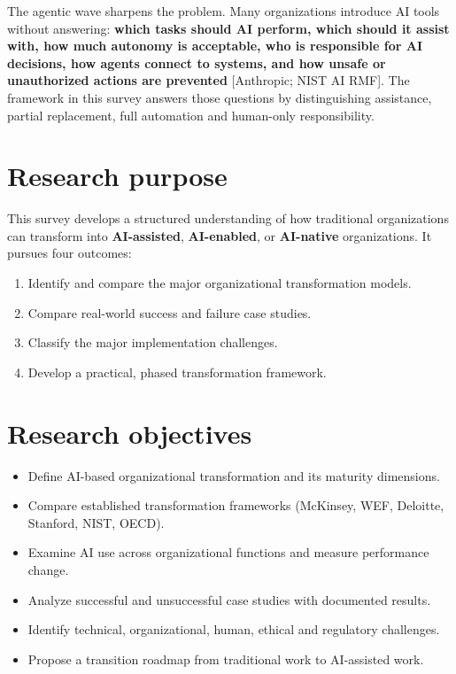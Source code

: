 The agentic wave sharpens the problem. Many organizations introduce AI tools
without answering: \textbf{which tasks should AI perform, which should it
assist with, how much autonomy is acceptable, who is responsible for AI
decisions, how agents connect to systems, and how unsafe or unauthorized
actions are prevented} [Anthropic; NIST AI RMF]. The framework in this survey
answers those questions by distinguishing assistance, partial replacement,
full automation and human-only responsibility.

\section{Research purpose}

This survey develops a structured understanding of how traditional
organizations can transform into \textbf{AI-assisted}, \textbf{AI-enabled},
or \textbf{AI-native} organizations. It pursues four outcomes:

\begin{enumerate}
  \item Identify and compare the major organizational transformation models.
  \item Compare real-world success and failure case studies.
  \item Classify the major implementation challenges.
  \item Develop a practical, phased transformation framework.
\end{enumerate}

\section{Research objectives}

\begin{itemize}
  \item Define AI-based organizational transformation and its maturity dimensions.
  \item Compare established transformation frameworks (McKinsey, WEF, Deloitte,
        Stanford, NIST, OECD).
  \item Examine AI use across organizational functions and measure performance change.
  \item Analyze successful and unsuccessful case studies with documented results.
  \item Identify technical, organizational, human, ethical and regulatory challenges.
  \item Propose a transition roadmap from traditional work to AI-assisted work.
\end{itemize}

